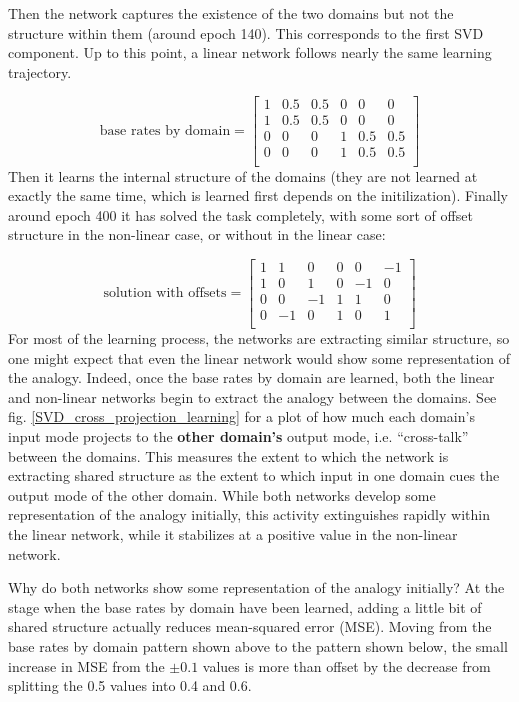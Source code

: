 \documentclass[10pt,letterpaper]{article}
\begin{document}
Then the network captures the existence of the two domains but not the structure within them (around epoch 140). This corresponds to the first SVD component. Up to this point, a linear network follows nearly the same learning trajectory. \par
{ 
\[
\text{base rates by domain} = \left[ \begin{matrix} 
1 & 0.5 & 0.5 & 0 & 0 & 0 \\
1 & 0.5 & 0.5 & 0 & 0 & 0 \\
0 & 0 & 0 & 1 & 0.5 & 0.5  \\
0 & 0 & 0 & 1 & 0.5 & 0.5  \\
\end{matrix}  \right] 
\] 
}
Then it learns the internal structure of the domains (they are not learned at exactly the same time, which is learned first depends on the initilization). Finally around epoch 400 it has solved the task completely, with some sort of offset structure in the non-linear case, or without in the linear case:\par
{ 
\[
\text{solution with offsets} = \left[ \begin{matrix} 
1 & 1 & 0 & 0 & 0 & -1 \\
1 & 0 & 1 & 0 & -1 & 0 \\
 0 & 0 & -1 & 1 & 1 & 0\\
 0 & -1 & 0 & 1 & 0 & 1\\
\end{matrix}  \right] 
\]
}
For most of the learning process, the networks are extracting similar structure, so one might expect that even the linear network would show some representation of the analogy. Indeed, once the base rates by domain are learned, both the linear and non-linear networks begin to extract the analogy between the domains. See fig. \ref{SVD_cross_projection_learning} for a plot of how much each domain's input mode projects to the \textbf{other domain's} output mode, i.e. ``cross-talk'' between the domains. This measures the extent to which the network is extracting shared structure as the extent to which input in one domain cues the output mode of the other domain. While both networks develop some representation of the analogy initially, this activity extinguishes rapidly within the linear network, while it stabilizes at a positive value in the non-linear network. \par
Why do both networks show some representation of the analogy initially? At the stage when the base rates by domain have been learned, adding a little bit of shared structure actually reduces mean-squared error (MSE). Moving from the base rates by domain pattern shown above to the pattern shown below, the small increase in MSE from the \(\pm 0.1\) values is more than offset by the decrease from splitting the 0.5 values into 0.4 and 0.6. \par 
\end{document}

